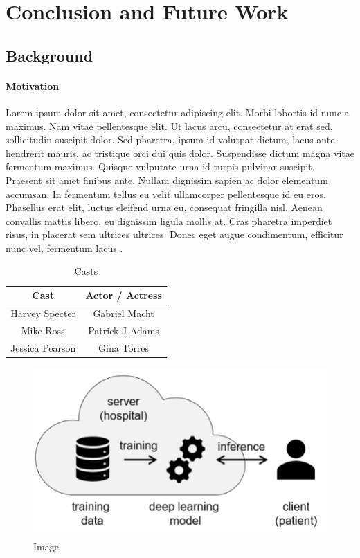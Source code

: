\chapter{Conclusion and Future Work}

\section{Background}

\subsubsection{Motivation}

Lorem ipsum dolor sit amet, consectetur adipiscing elit. Morbi lobortis id nunc a maximus. Nam vitae pellentesque elit. Ut lacus arcu, consectetur at erat sed, sollicitudin suscipit dolor. Sed pharetra, ipsum id volutpat dictum, lacus ante hendrerit mauris, ac tristique orci dui quis dolor. Suspendisse dictum magna vitae fermentum maximus. Quisque vulputate urna id turpis pulvinar suscipit. Praesent sit amet finibus ante. Nullam dignissim sapien ac dolor elementum accumsan. In fermentum tellus eu velit ullamcorper pellentesque id eu eros. Phasellus erat elit, luctus eleifend urna eu, consequat fringilla nisl. Aenean convallis mattis libero, eu dignissim ligula mollis at. Cras pharetra imperdiet risus, in placerat sem ultrices ultrices. Donec eget augue condimentum, efficitur nunc vel, fermentum lacus \cite{book}.

\begin{table}[!ht]
    \centering
    \begin{tabular}{@{}cc@{}}
    \toprule
    Cast            & Actor / Actress \\ \midrule
    Harvey Specter  & Gabriel Macht   \\
    Mike Ross       & Patrick J Adams \\
    Jessica Pearson & Gina Torres     \\ \bottomrule
    \end{tabular}
    \caption{Casts}
\end{table}

\begin{figure}[!ht]
    \centering
    \includegraphics{figures/diag.png}
    \caption{Image}
\end{figure}

